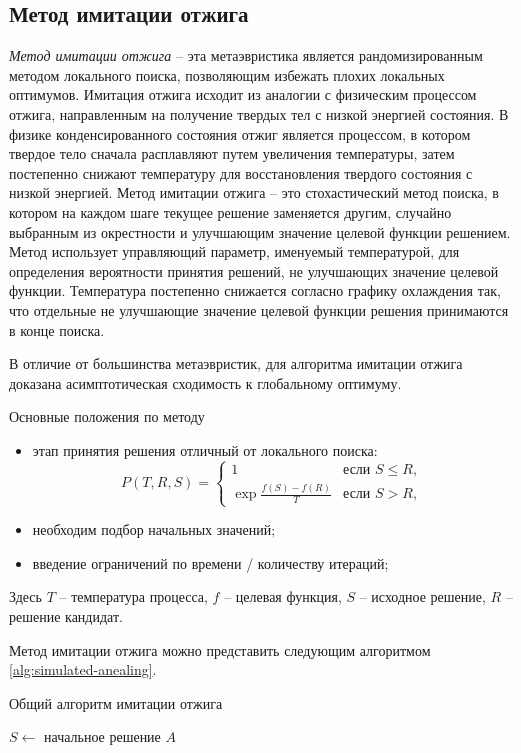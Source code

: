 \subsection{Метод имитации отжига}
\emph{Метод имитации отжига} -- эта метаэвристика является рандомизированным методом локального поиска, 
позволяющим избежать плохих локальных оптимумов. Имитация отжига исходит из аналогии с физическим процессом 
отжига, направленным на получение твердых тел с низкой энергией состояния. В физике конденсированного 
состояния отжиг является процессом, в котором твердое тело сначала расплавляют путем увеличения температуры, 
затем постепенно снижают температуру для восстановления твердого состояния с низкой энергией. Метод имитации 
отжига -- это стохастический метод поиска, в котором на каждом шаге текущее решение заменяется другим, 
случайно выбранным из окрестности и улучшающим значение целевой функции решением. Метод использует 
управляющий параметр, именуемый температурой, для определения вероятности принятия решений, не улучшающих 
значение целевой функции. Температура постепенно снижается согласно графику охлаждения так, что отдельные не 
улучшающие значение целевой функции решения принимаются в конце поиска.

В отличие от большинства метаэвристик, для алгоритма имитации отжига доказана асимптотическая сходимость к 
глобальному оптимуму. 

Основные положения по методу
\begin{itemize}
    \item этап принятия решения отличный от локального поиска:
    \[
        P(T, R, S)= \left\{\begin{array}{cc}
            1                       & \text{если } S \leq R, \\
            \exp\frac{f(S)-f(R)}{T} & \text{если } S > R,
        \end{array}\right.
    \]
    \item необходим подбор начальных значений;
    \item введение ограничений по времени / количеству итераций;
\end{itemize}

Здесь \( T \) -- температура процесса, \( f \) -- целевая функция, \( S \) -- исходное решение, 
\( R \) -- решение кандидат.

Метод имитации отжига можно представить следующим алгоритмом \ref{alg:simulated-anealing}.

\newpage

\begin{algorithm}[ht!]
    \caption{Общий алгоритм имитации отжига}
    \( S \leftarrow \) начальное решение \( A \)\;
    \label{alg:simulated-anealing}
\end{algorithm}

